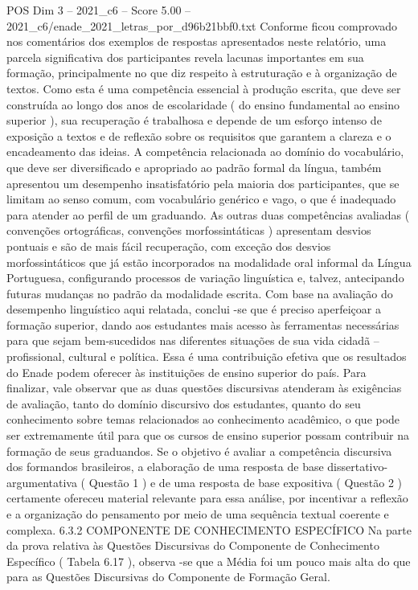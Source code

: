 \begin{textsample}{POS Dim 3 – 2021\_c6 – Score 5.00 – 2021\_c6/enade\_2021\_letras\_por\_d96b21bbf0.txt}
Conforme ficou comprovado nos comentários dos exemplos de respostas apresentados neste relatório, uma parcela significativa dos participantes revela lacunas importantes em sua formação, principalmente no que diz respeito à estruturação e à organização de textos.
Como esta é uma competência essencial à produção escrita, que deve ser construída ao longo dos anos de escolaridade ( do ensino fundamental ao ensino superior ), sua recuperação é trabalhosa e depende de um esforço intenso de exposição a textos e de reflexão sobre os requisitos que garantem a clareza e o encadeamento das ideias.
A competência relacionada ao domínio do vocabulário, que deve ser diversificado e apropriado ao padrão formal da língua, também apresentou um desempenho insatisfatório pela maioria dos participantes, que se limitam ao senso comum, com vocabulário genérico e vago, o que é inadequado para atender ao perfil de um graduando.
As outras duas competências avaliadas ( convenções ortográficas, convenções morfossintáticas ) apresentam desvios pontuais e são de mais fácil recuperação, com exceção dos desvios morfossintáticos que já estão incorporados na modalidade oral informal da Língua Portuguesa, configurando processos de variação linguística e, talvez, antecipando futuras mudanças no padrão da modalidade escrita.
Com base na avaliação do desempenho linguístico aqui relatada, conclui -se que é preciso aperfeiçoar a formação superior, dando aos estudantes mais acesso às ferramentas necessárias para que sejam bem-sucedidos nas diferentes situações de sua vida cidadã – profissional, cultural e política.
Essa é uma contribuição efetiva que os resultados do Enade podem oferecer às instituições de ensino superior do país.
Para finalizar, vale observar que as duas questões discursivas atenderam às exigências de avaliação, tanto do domínio discursivo dos estudantes, quanto do seu conhecimento sobre temas relacionados ao conhecimento acadêmico, o que pode ser extremamente útil para que os cursos de ensino superior possam contribuir na formação de seus graduandos.
Se o objetivo é avaliar a competência discursiva dos formandos brasileiros, a elaboração de uma resposta de base dissertativo-argumentativa ( Questão 1 ) e de uma resposta de base expositiva ( Questão 2 ) certamente ofereceu material relevante para essa análise, por incentivar a reflexão e a organização do pensamento por meio de uma sequência textual coerente e complexa. 6.3.2 COMPONENTE DE CONHECIMENTO ESPECÍFICO Na parte da prova relativa às Questões Discursivas do Componente de Conhecimento Específico ( Tabela 6.17 ), observa -se que a Média foi um pouco mais alta do que para as Questões Discursivas do Componente de Formação Geral.

\end{textsample}

